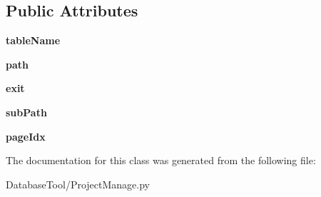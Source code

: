 \subsection*{Public Attributes}
\begin{DoxyCompactItemize}
\item 
\mbox{\label{classMIS_1_1DatabaseTool_1_1ProjectManage_1_1Cormis__CachingIterator_aa8c1b4ca230323b53910296231e665af}} 
{\bfseries table\+Name}
\item 
\mbox{\label{classMIS_1_1DatabaseTool_1_1ProjectManage_1_1Cormis__CachingIterator_afa6b7a8956068ebb89725c7618ecb12e}} 
{\bfseries path}
\item 
\mbox{\label{classMIS_1_1DatabaseTool_1_1ProjectManage_1_1Cormis__CachingIterator_a8ff41b3baa00c8ff6023a7d0137215c1}} 
{\bfseries exit}
\item 
\mbox{\label{classMIS_1_1DatabaseTool_1_1ProjectManage_1_1Cormis__CachingIterator_acc558d4e97b0929a3b56d97f403e3b5b}} 
{\bfseries sub\+Path}
\item 
\mbox{\label{classMIS_1_1DatabaseTool_1_1ProjectManage_1_1Cormis__CachingIterator_af77e960ac842227e00453a9f4dd23699}} 
{\bfseries page\+Idx}
\end{DoxyCompactItemize}


The documentation for this class was generated from the following file\+:\begin{DoxyCompactItemize}
\item 
Database\+Tool/Project\+Manage.\+py\end{DoxyCompactItemize}
